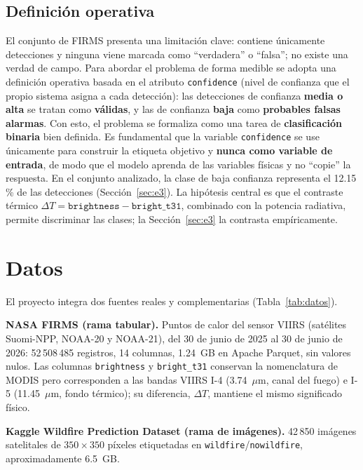 \documentclass[conference]{IEEEtran}
\begin{document}
\subsection{Definición operativa}
El conjunto de FIRMS presenta una limitación clave: contiene únicamente detecciones y ninguna viene marcada como ``verdadera'' o ``falsa''; no existe una verdad de campo. Para abordar el problema de forma medible se adopta una definición operativa basada en el atributo \texttt{confidence} (nivel de confianza que el propio sistema asigna a cada detección): las detecciones de confianza \textbf{media o alta} se tratan como \textbf{válidas}, y las de confianza \textbf{baja} como \textbf{probables falsas alarmas}. Con esto, el problema se formaliza como una tarea de \textbf{clasificación binaria} bien definida. Es fundamental que la variable \texttt{confidence} se use únicamente para construir la etiqueta objetivo y \textbf{nunca como variable de entrada}, de modo que el modelo aprenda de las variables físicas y no ``copie'' la respuesta. En el conjunto analizado, la clase de baja confianza representa el 12.15\,\% de las detecciones (Sección~\ref{sec:e3}). La hipótesis central es que el contraste térmico $\Delta T = \texttt{brightness}-\texttt{bright\_t31}$, combinado con la potencia radiativa, permite discriminar las clases; la Sección~\ref{sec:e3} la contrasta empíricamente.

\section{Datos}
\label{sec:datos}
El proyecto integra dos fuentes reales y complementarias (Tabla~\ref{tab:datos}).

\textbf{NASA FIRMS (rama tabular).} Puntos de calor del sensor VIIRS (satélites Suomi-NPP, NOAA-20 y NOAA-21), del 30 de junio de 2025 al 30 de junio de 2026: 52\,508\,485 registros, 14 columnas, 1.24~GB en Apache Parquet, sin valores nulos. Las columnas \texttt{brightness} y \texttt{bright\_t31} conservan la nomenclatura de MODIS pero corresponden a las bandas VIIRS I-4 (3.74~$\mu$m, canal del fuego) e I-5 (11.45~$\mu$m, fondo térmico); su diferencia, $\Delta T$, mantiene el mismo significado físico.

\textbf{Kaggle Wildfire Prediction Dataset (rama de imágenes).} 42\,850 imágenes satelitales de $350\times350$ píxeles etiquetadas en \texttt{wildfire}/\texttt{nowildfire}, aproximadamente 6.5~GB.
\end{document}
